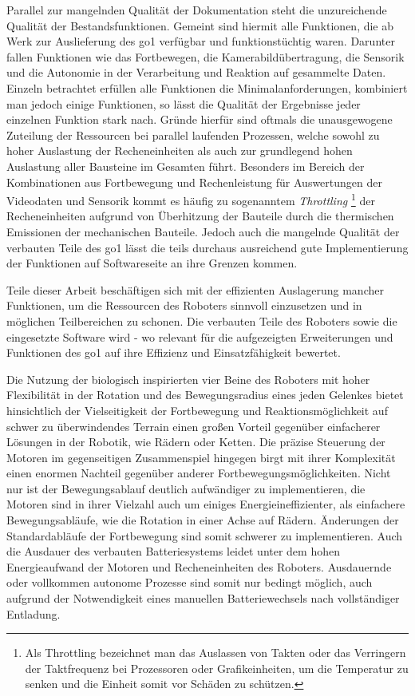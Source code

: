Parallel zur mangelnden Qualität der Dokumentation steht die unzureichende Qualität der Bestandsfunktionen.
Gemeint sind hiermit alle Funktionen, die ab Werk zur Auslieferung des \gls{go1} verfügbar und funktionstüchtig waren.
Darunter fallen Funktionen wie das Fortbewegen, die Kamerabildübertragung, die Sensorik und die Autonomie in der Verarbeitung
und Reaktion auf gesammelte Daten.
Einzeln betrachtet erfüllen alle Funktionen die Minimalanforderungen, kombiniert man jedoch einige Funktionen, so lässt
die Qualität der Ergebnisse jeder einzelnen Funktion stark nach.
Gründe hierfür sind oftmals die unausgewogene Zuteilung der Ressourcen bei parallel laufenden Prozessen, welche sowohl zu
hoher Auslastung der Recheneinheiten als auch zur grundlegend hohen Auslastung aller Bausteine im Gesamten führt.
Besonders im Bereich der Kombinationen aus Fortbewegung und Rechenleistung für Auswertungen der Videodaten und Sensorik
kommt es häufig zu sogenanntem \emph{Throttling}
\footnote{Als Throttling bezeichnet man das Auslassen von Takten oder das Verringern der Taktfrequenz bei Prozessoren
oder Grafikeinheiten, um die Temperatur zu senken und die Einheit somit vor Schäden zu schützen.}
der Recheneinheiten aufgrund von Überhitzung der Bauteile durch die thermischen
Emissionen der mechanischen Bauteile.
Jedoch auch die mangelnde Qualität der verbauten Teile des \gls{go1} lässt die teils durchaus ausreichend gute Implementierung der
Funktionen auf Softwareseite an ihre Grenzen kommen.

Teile dieser Arbeit beschäftigen sich mit der effizienten Auslagerung mancher Funktionen, um die Ressourcen des Roboters
sinnvoll einzusetzen und in möglichen Teilbereichen zu schonen.
Die verbauten Teile des Roboters sowie die eingesetzte Software wird - wo relevant für die aufgezeigten Erweiterungen und
Funktionen des \gls{go1} auf ihre Effizienz und Einsatzfähigkeit bewertet.



Die Nutzung der biologisch inspirierten vier Beine des Roboters mit hoher Flexibilität in der Rotation und des Bewegungsradius
eines jeden Gelenkes bietet hinsichtlich der Vielseitigkeit der Fortbewegung und Reaktionsmöglichkeit auf schwer zu
überwindendes Terrain einen großen Vorteil gegenüber einfacherer Lösungen in der Robotik, wie Rädern oder Ketten.
Die präzise Steuerung der Motoren im gegenseitigen Zusammenspiel hingegen birgt mit ihrer Komplexität einen enormen Nachteil
gegenüber anderer Fortbewegungsmöglichkeiten.
Nicht nur ist der Bewegungsablauf deutlich aufwändiger zu implementieren, die Motoren sind in ihrer Vielzahl auch
um einiges Energieineffizienter, als einfachere Bewegungsabläufe, wie die Rotation in einer Achse auf Rädern.
Änderungen der Standardabläufe der Fortbewegung sind somit schwerer zu implementieren.
Auch die Ausdauer des verbauten Batteriesystems leidet unter dem hohen Energieaufwand der Motoren und Recheneinheiten des Roboters.
Ausdauernde oder vollkommen autonome Prozesse sind somit nur bedingt möglich, auch aufgrund der Notwendigkeit eines
manuellen Batteriewechsels nach vollständiger Entladung.

